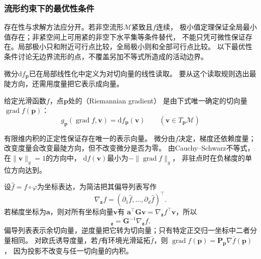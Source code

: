 \subsubsection{流形约束下的最优性条件}
\label{sec:geometry-point-optimality}

存在性与求解方法应分开。若非空流形$\mathcal M$紧致且$f$连续，
极小值定理保证全局最小值存在；非紧空间上可用紧的非空下水平集等条件替代，
不能只凭可微性保证存在。局部极小只和附近可行点比较，全局极小则和全部可行点比较。
以下最优性条件讨论无边界流形的点，不覆盖另加不等式所造成的活动边界。

微分$\mathrm df_{\bm p}$已在局部线性化中定义为对切向量的线性读取。
要从这个读取规则选出最陡方向，还需用度量把它表示成向量。
\begin{definition}[Riemann梯度]
\label{def:geometry-riemannian-gradient}
给定光滑函数$f$，点$\bm p$处的（Riemannian gradient）
是由下式唯一确定的切向量$\operatorname{grad}f(\bm p)$：
\begin{equation}
 g_{\bm p}(\operatorname{grad}f,\bm v)=\mathrm df_{\bm p}(\bm v)
 \qquad(\bm v\in T_{\bm p}\mathcal M)
 \label{eq:geometry-riemannian-gradient-definition}
\end{equation}
\end{definition}
有限维内积的正定性保证存在唯一的表示向量。
微分由$f$决定，梯度还依赖度量；改变度量会改变最陡方向，但不改变微分是否为零。
由Cauchy--Schwarz不等式，在$\lVert\bm v\rVert_g=1$的方向中，
$\mathrm df(\bm v)$最小为$-\lVert\operatorname{grad}f\rVert_g$，
非驻点时在负梯度的单位方向达到。

设$\widehat f=f\circ\varphi$为坐标表达，为简洁把其偏导列表写作
\[
 \nabla_{\bm z}f=(\partial_1\widehat f,\ldots,\partial_d\widehat f)^\top.
\]
若梯度坐标为$\bm a$，则对所有坐标向量$\bm v$有
$\bm a^\top\bm G\bm v=\nabla_{\bm z}f^\top\bm v$，所以
\begin{equation}
 [\operatorname{grad}f]_{\bm z}=\bm G^{-1}\nabla_{\bm z}f.
 \label{eq:geometry-riemannian-gradient-coordinates}
\end{equation}
偏导列表表示余切向量，逆度量把它转为切向量；只有特定正交归一坐标中二者分量相同。
对欧氏诱导度量，若$f$有环境光滑延拓$\bar f$，则
$\operatorname{grad}f(\bm p)=\bm P_{\bm p}\nabla\bar f(\bm p)$，
因为投影不改变与任一切向量的内积。

